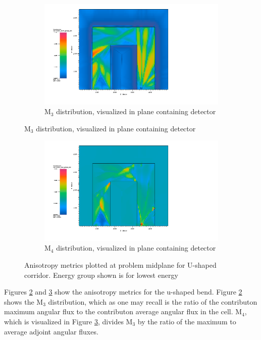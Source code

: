 \begin{figure}[htb!]
  \centering
  \begin{subfigure}[t]{\textwidth}
    \includegraphics[width=0.9\linewidth]{./chapters/characterization_probs/figures/char/prob_2/prob2M3G26.png}
    \caption{M$_3$ distribution, visualized in plane containing detector}
    \label{fig:ubendM3}
  \end{subfigure}
\end{figure}
\begin{figure}[htb!]\ContinuedFloat
  \centering
  \begin{subfigure}[t]{\textwidth}
    \includegraphics[width=0.9\linewidth]{./chapters/characterization_probs/figures/char/prob_2/prob2M4G26.png}
    \caption{M$_4$ distribution, visualized in plane containing detector}
    \label{fig:ubendM4}
  \end{subfigure}
  \caption[Anisotropy metrics plotted at problem midplane for U-shaped
  corridor.]{Anisotropy metrics plotted at problem midplane for U-shaped
    corridor. Energy group shown is for lowest energy}
  \label{fig:ubendmetrics}
\end{figure}

Figures \ref{fig:ubendM3} and \ref{fig:ubendM4} show the anisotropy metrics for
the u-shaped bend. Figure \ref{fig:ubendM3} shows the M$_3$ distribution, which
as one may recall is the ratio of the contributon maximum angular flux to the
contributon average angular flux in the cell. M$_4$, which is visualized in
Figure \ref{fig:ubendM4}, divides M$_3$ by the ratio of the maximum to average
adjoint angular fluxes.

